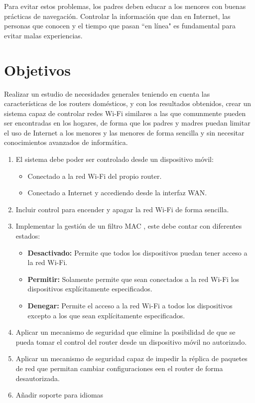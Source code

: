 \documentclass[12pt]{article}
\begin{document}
Para evitar estos problemas, los padres deben educar a los menores con buenas prácticas de navegación. Controlar la información que dan en Internet, las personas que conocen y el tiempo que pasan ``en línea" es fundamental para evitar malas experiencias. 

\section{Objetivos}
    Realizar un estudio de necesidades generales teniendo en cuenta las características de los routers domésticos, y con los resultados obtenidos, crear un sistema capaz de controlar redes Wi-Fi similares a las que comunmente pueden ser encontradas en los hogares, de forma que los padres y madres puedan limitar el uso de Internet a los menores y las menores de forma sencilla y sin necesitar conocimientos avanzados de informática.
    \begin{enumerate}
        \item El sistema debe poder ser controlado desde un dispositivo móvil:
        \begin{itemize}
            \item Conectado a la red Wi-Fi del propio router.
            \item Conectado a Internet y accediendo desde la interfaz WAN.
        \end{itemize}

        \item Incluir control para encender y apagar la red Wi-Fi de forma sencilla.
        \item Implementar la gestión de un filtro MAC , este debe contar con diferentes estados:
            \begin{itemize}
                \item \textbf{Desactivado:} Permite que todos los dispositivos puedan tener acceso a la red Wi-Fi.
                \item \textbf{Permitir:} Solamente permite que sean conectados a la red Wi-Fi los dispositivos explícitamente especificados. 
                \item \textbf{Denegar:} Permite el acceso a la red Wi-Fi a todos los dispositivos excepto a los que sean explícitamente especificados.
            \end{itemize}
        \item Aplicar un mecanismo de seguridad que elimine la posibilidad de que se pueda tomar el control del router desde un dispositivo móvil no autorizado.
        \item Aplicar un mecanismo de seguridad capaz de impedir la réplica de paquetes de red que permitan cambiar configuraciones een el router de forma desautorizada.
        \item Añadir soporte para idiomas
    \end{enumerate}
\end{document}
